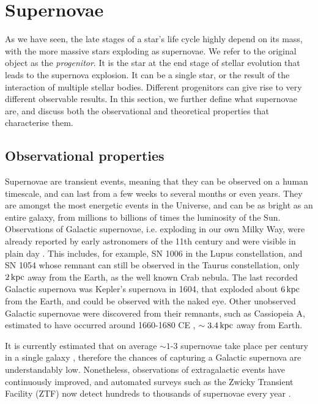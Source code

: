 \section{Supernovae} \label{sec:sne}

As we have seen, the late stages of a star's life cycle highly depend on its mass, with the more massive stars exploding as supernovae. We refer to the original object as the \emph{progenitor}. It is the star at the end stage of stellar evolution that leads to the supernova explosion. It can be a single star, or the result of the interaction of multiple stellar bodies. Different progenitors can give rise to very different observable results. In this section, we further define what supernovae are, and discuss both the observational and theoretical properties that characterise them.

\subsection{Observational properties} \label{sec:sne_obs}

Supernovae are transient events, meaning that they can be observed on a human timescale, and can last from a few weeks to several months or even years. They are amongst the most energetic events in the Universe, and can be as bright as an entire galaxy, from millions to billions of times the luminosity of the Sun. Observations of Galactic supernovae, i.e. exploding in our own Milky Way, were already reported by early astronomers of the 11th century and were visible in plain day \citep{Hamacher2014}. This includes, for example, SN 1006 in the Lupus constellation, and SN 1054 whose remnant can still be observed in the Taurus constellation, only \(2\,\mathrm{kpc}\) away from the Earth, as the well known Crab nebula. The last recorded Galactic supernova was Kepler's supernova in 1604, that exploded about \(6\,\mathrm{kpc}\) from the Earth, and could be observed with the naked eye. Other unobserved Galactic supernovae were discovered from their remnants, such as Cassiopeia A, estimated to have occurred around 1660-1680 CE \citep{Fesen2006}, \(\sim3.4\,\mathrm{kpc}\) away from Earth.

It is currently estimated that on average \(\sim1\text{-}3\) supernovae take place per century in a single galaxy \citep{Rozwadowska2021}, therefore the chances of capturing a Galactic supernova are understandably low. Nonetheless, observations of extragalactic events have continuously improved, and automated surveys such as the Zwicky Transient Facility (ZTF) now detect hundreds to thousands of supernovae every year \citep{Fremling2020}.

